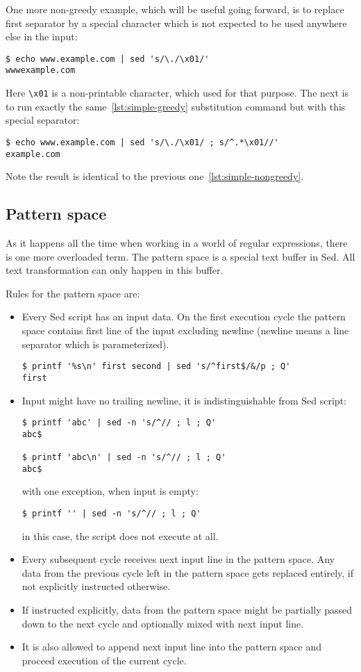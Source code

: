 One more non-greedy example, which will be useful going forward, is to replace
first separator by a special character which is not expected to be used anywhere
else in the input:
\begin{lstlisting}
$ echo www.example.com | sed 's/\./\x01/'                
wwwexample.com
\end{lstlisting}
Here \lstinline{\x01} is a non-printable character, which used for that purpose.
The next is to run exactly the same~\ref{lst:simple-greedy} substitution command
but with this special separator:
\begin{lstlisting}
$ echo www.example.com | sed 's/\./\x01/ ; s/^.*\x01//'
example.com
\end{lstlisting}
Note the result is identical to the previous one~\ref{lst:simple-nongreedy}.

\subsection{Pattern space}

As it happens all the time when working in a world of regular expressions,
there is one more overloaded term. The pattern space is a special text buffer in Sed.
All text transformation can only happen in this buffer.

Rules for the pattern space are:
\begin{itemize}
	\item Every Sed script has an input data. On the first execution cycle
		the pattern space contains first line of the input
		excluding newline (newline means a line separator which is
		parameterized).
\begin{lstlisting}
$ printf '%s\n' first second | sed 's/^first$/&/p ; Q'
first
\end{lstlisting}
	\item Input might have no trailing newline, it is indistinguishable
		from Sed script:
\begin{lstlisting}
$ printf 'abc' | sed -n 's/^// ; l ; Q'    
abc$

$ printf 'abc\n' | sed -n 's/^// ; l ; Q'
abc$
\end{lstlisting}
		with one exception, when input is empty:
\begin{lstlisting}
$ printf '' | sed -n 's/^// ; l ; Q'
\end{lstlisting}
		in this case, the script does not execute at all.
		\item Every subsequent cycle receives next input line
			in the pattern space. Any data from the previous
			cycle left in the pattern space gets replaced
			entirely, if not explicitly instructed otherwise.
		\item If instructed explicitly, data from the pattern space
			might be partially passed down to the next cycle and
			optionally mixed with next input line.
		\item It is also allowed to append next input line into the
			pattern space and proceed execution of the current cycle.
\end{itemize}

